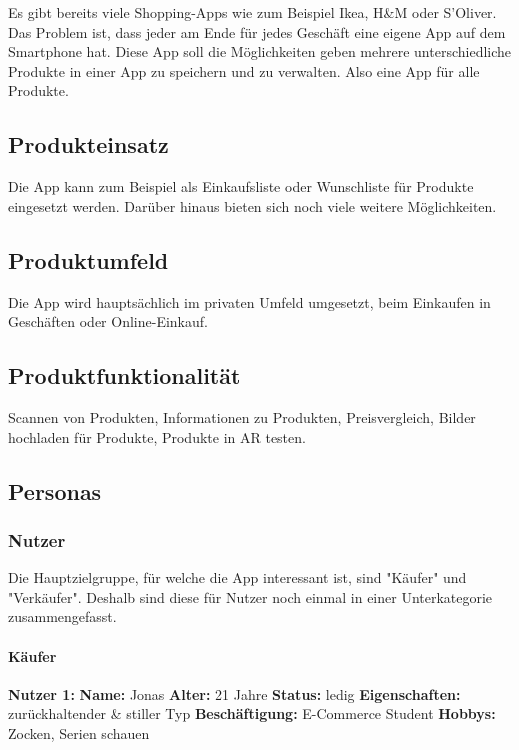\documentclass{scrartcl}
\begin{document}
Es gibt bereits viele Shopping-Apps wie zum Beispiel Ikea, H\&M oder S'Oliver. Das Problem ist, dass jeder am Ende für jedes Geschäft eine eigene App auf dem Smartphone hat. Diese App soll die Möglichkeiten geben mehrere unterschiedliche Produkte in einer App zu speichern und zu verwalten. Also eine App für alle Produkte.

\subsection{Produkteinsatz}

 Die App kann zum Beispiel als Einkaufsliste oder Wunschliste für Produkte eingesetzt werden.
 Darüber hinaus bieten sich noch viele weitere Möglichkeiten.

\subsection{Produktumfeld}

Die App wird hauptsächlich im privaten Umfeld umgesetzt, beim Einkaufen in Geschäften oder Online-Einkauf.

\subsection{Produktfunktionalität}

Scannen von Produkten, Informationen zu Produkten, Preisvergleich, Bilder hochladen für Produkte, Produkte in AR testen.

\subsection{Personas}

\subsubsection{Nutzer}

Die Hauptzielgruppe, für welche die App interessant ist, sind "Käufer" und "Verkäufer". Deshalb sind diese für Nutzer noch einmal in einer Unterkategorie zusammengefasst.

\paragraph{Käufer} \mbox{}\newline

\noindent \textbf{Nutzer 1: \newline}
\textbf{Name:} Jonas \newline
\textbf{Alter:} 21 Jahre \newline 
\textbf{Status:} ledig \newline 
\textbf{Eigenschaften:} zurückhaltender \& stiller Typ \newline
\textbf{Beschäftigung:} E-Commerce Student \newline
\textbf{Hobbys:} Zocken, Serien schauen \newline
\end{document}
